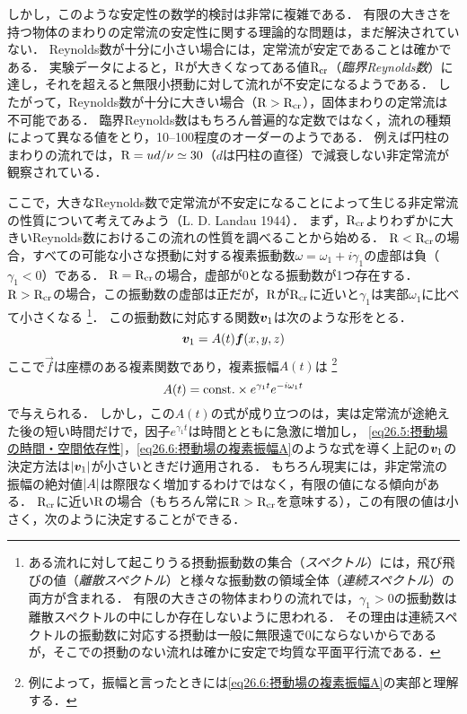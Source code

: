 しかし，このような安定性の数学的検討は非常に複雑である．
有限の大きさを持つ物体のまわりの定常流の安定性に関する理論的な問題は，まだ解決されていない．
Reynolds数が十分に小さい場合には，定常流が安定であることは確かである．
実験データによると，$\mathrm{R}$が大きくなってある値$\mathrm{R}_{\mathrm{cr}}$（\emph{臨界Reynolds数}）に達し，それを超えると無限小摂動に対して流れが不安定になるようである．
したがって，Reynolds数が十分に大きい場合（$\mathrm{R}>\mathrm{R}_{\mathrm{cr}}$），固体まわりの定常流は不可能である．
臨界Reynolds数はもちろん普遍的な定数ではなく，流れの種類によって異なる値をとり，10--100程度のオーダーのようである．
例えば円柱のまわりの流れでは，$\mathrm{R} = ud/\nu \simeq 30$（$d$は円柱の直径）で減衰しない非定常流が観察されている．

ここで，大きなReynolds数で定常流が不安定になることによって生じる非定常流の性質について考えてみよう（L. D. Landau 1944）．
まず，$\mathrm{R}_{\mathrm{cr}}$よりわずかに大きいReynolds数におけるこの流れの性質を調べることから始める．
$\mathrm{R}<\mathrm{R}_{\mathrm{cr}}$の場合，すべての可能な小さな摂動に対する複素振動数$\omega=\omega_1+i\gamma_1$の虚部は負（$\gamma_1<0$）である．
$\mathrm{R}=\mathrm{R}_{\mathrm{cr}}$の場合，虚部が0となる振動数が1つ存在する．
$\mathrm{R}>\mathrm{R}_{\mathrm{cr}}$の場合，この振動数の虚部は正だが，$\mathrm{R}$が$\mathrm{R}_{\mathrm{cr}}$に近いと$\gamma_1$は実部$\omega_1$に比べて小さくなる
\footnote{
ある流れに対して起こりうる摂動振動数の集合（\emph{スペクトル}）には，飛び飛びの値（\emph{離散スペクトル}）と様々な振動数の領域全体（\emph{連続スペクトル}）の両方が含まれる．
有限の大きさの物体まわりの流れでは，$\gamma_1>0$の振動数は離散スペクトルの中にしか存在しないように思われる．
その理由は連続スペクトルの振動数に対応する摂動は一般に無限遠で0にならないからであるが，そこでの摂動のない流れは確かに安定で均質な平面平行流である．
}．
この振動数に対応する関数$\vb*{v}_1$は次のような形をとる．
\begin{equation}\label{eq26.5:摂動場の時間・空間依存性}
    \vb*{v}_1 = A(t) \vb*{f}(x,y,z)
\end{equation}
ここで$\vec{f}$は座標のある複素関数であり，複素振幅$A(t)$は
\footnote{例によって，振幅と言ったときには\eqref{eq26.6:摂動場の複素振幅A}の実部と理解する．}
\begin{equation}\label{eq26.6:摂動場の複素振幅A}
    A(t) = \mathrm{const.} \times e^{\gamma_1t}e^{-i\omega_1t}
\end{equation}
で与えられる．
しかし，この$A(t)$の式が成り立つのは，実は定常流が途絶えた後の短い時間だけで，因子$e^{\gamma_1t}$は時間とともに急激に増加し，
\eqref{eq26.5:摂動場の時間・空間依存性}，\eqref{eq26.6:摂動場の複素振幅A}のような式を導く上記の$\vb*{v}_1$の決定方法は$\abs{\vb*{v}_1}$が小さいときだけ適用される．
もちろん現実には，非定常流の振幅の絶対値$\abs{A}$は際限なく増加するわけではなく，有限の値になる傾向がある．
$\mathrm{R}_{\mathrm{cr}}$に近い$\mathrm{R}$の場合（もちろん常に$\mathrm{R}>\mathrm{R}_{\mathrm{cr}}$を意味する），この有限の値は小さく，次のように決定することができる．


